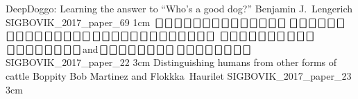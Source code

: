 
\addpaper
	{DeepDoggo: Learning the answer to ``Who's a good dog?''}
	{Benjamin J.\ Lengerich}
	{}
	{SIGBOVIK_2017_paper_69}
	{1cm}
	{}
\addpaper
	{$\bigbox\bigbox\bigbox\bigbox\bigbox\bigbox\bigbox\bigbox\bigbox\bigbox\bigbox\bigbox\bigbox\bigbox$\quad $\bigbox\bigbox\bigbox\bigbox\bigbox\bigbox$\quad $\bigbox\bigbox\bigbox\bigbox$\quad $\bigbox\bigbox\bigbox\bigbox\bigbox$\quad $\bigbox\bigbox\bigbox\bigbox\bigbox$\quad $\bigbox\bigbox$\quad $\bigbox\bigbox\bigbox\bigbox\bigbox\bigbox$}
	{$\bigbox\bigbox\bigbox\bigbox\bigbox\bigbox\bigbox$\quad $\bigbox\bigbox\bigbox$\quad $\bigbox\bigbox\bigbox\bigbox\bigbox\bigbox\bigbox\bigbox$\quad and\quad $\bigbox\bigbox\bigbox\bigbox\bigbox\bigbox\bigbox\bigbox$\quad $\bigbox\bigbox\bigbox\bigbox\bigbox\bigbox\bigbox\bigbox$}
	{}
	{SIGBOVIK_2017_paper_22}
	{3cm}
	{}
\addpaper
	{Distinguishing humans from other forms of cattle}
	{Boppity Bob Martinez and Flokkka\textdegree\ Haurilet}
	{}
	{SIGBOVIK_2017_paper_23}
	{3cm}
	{}

